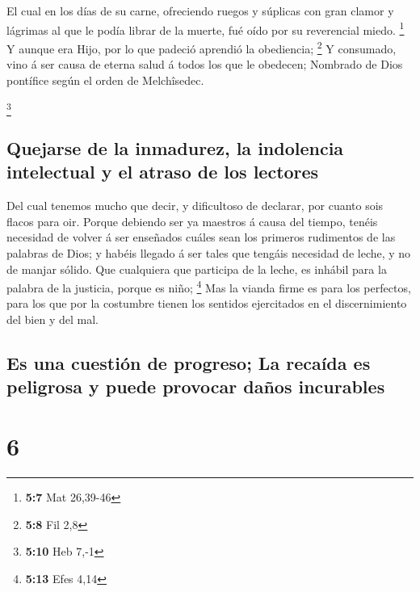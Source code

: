  El cual en los días de su carne, ofreciendo ruegos y
súplicas con gran clamor y lágrimas al que le podía librar de la muerte,
fué oído por su reverencial miedo. \footnote{\textbf{5:7} Mat 26,39-46}
 Y aunque era Hijo, por lo que padeció aprendió la
obediencia; \footnote{\textbf{5:8} Fil 2,8}  Y consumado,
vino á ser causa de eterna salud á todos los que le obedecen;
 Nombrado de Dios pontífice según el orden de Melchîsedec.

\footnote{\textbf{5:10} Heb 7,-1}

\hypertarget{quejarse-de-la-inmadurez-la-indolencia-intelectual-y-el-atraso-de-los-lectores}{%
\subsection{Quejarse de la inmadurez, la indolencia intelectual y el
atraso de los
lectores}\label{quejarse-de-la-inmadurez-la-indolencia-intelectual-y-el-atraso-de-los-lectores}}

 Del cual tenemos mucho que decir, y dificultoso de
declarar, por cuanto sois flacos para oir.  Porque debiendo
ser ya maestros á causa del tiempo, tenéis necesidad de volver á ser
enseñados cuáles sean los primeros rudimentos de las palabras de Dios; y
habéis llegado á ser tales que tengáis necesidad de leche, y no de
manjar sólido.  Que cualquiera que participa de la leche,
es inhábil para la palabra de la justicia, porque es niño; \footnote{\textbf{5:13}
  Efes 4,14}  Mas la vianda firme es para los perfectos,
para los que por la costumbre tienen los sentidos ejercitados en el
discernimiento del bien y del mal.

\hypertarget{es-una-cuestiuxf3n-de-progreso-la-recauxedda-es-peligrosa-y-puede-provocar-dauxf1os-incurables}{%
\subsection{Es una cuestión de progreso; La recaída es peligrosa y puede
provocar daños
incurables}\label{es-una-cuestiuxf3n-de-progreso-la-recauxedda-es-peligrosa-y-puede-provocar-dauxf1os-incurables}}

\hypertarget{section-5}{%
\section{6}\label{section-5}}

